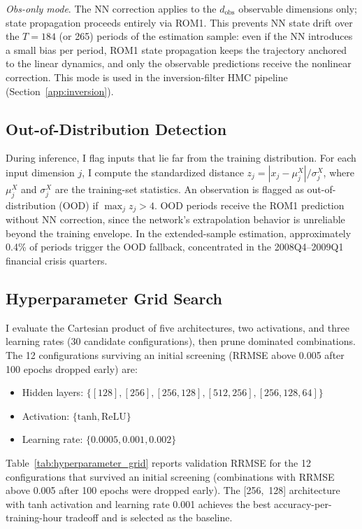 \documentclass[12pt]{article}
\theoremstyle{plain}
\theoremstyle{definition}
\theoremstyle{remark}
\begin{document}
\textit{Obs-only mode}. The NN correction applies to the $d_{\text{obs}}$ observable dimensions only; state propagation proceeds entirely via ROM1. This prevents NN state drift over the $T = 184$ (or 265) periods of the estimation sample: even if the NN introduces a small bias per period, ROM1 state propagation keeps the trajectory anchored to the linear dynamics, and only the observable predictions receive the nonlinear correction. This mode is used in the inversion-filter HMC pipeline (Section~\ref{app:inversion}).


\subsection{Out-of-Distribution Detection}
\label{app:ood}

During inference, I flag inputs that lie far from the training distribution. For each input dimension $j$, I compute the standardized distance $z_j = |x_j - \mu_j^X| / \sigma_j^X$, where $\mu_j^X$ and $\sigma_j^X$ are the training-set statistics. An observation is flagged as out-of-distribution (OOD) if $\max_j z_j > 4$. OOD periods receive the ROM1 prediction without NN correction, since the network's extrapolation behavior is unreliable beyond the training envelope. In the extended-sample estimation, approximately 0.4\% of periods trigger the OOD fallback, concentrated in the 2008Q4--2009Q1 financial crisis quarters.


\subsection{Hyperparameter Grid Search}

I evaluate the Cartesian product of five architectures, two activations, and three learning rates (30 candidate configurations), then prune dominated combinations. The 12 configurations surviving an initial screening (RRMSE above 0.005 after 100 epochs dropped early) are:
\begin{itemize}
\item Hidden layers: $\{[128], [256], [256, 128], [512, 256], [256, 128, 64]\}$
\item Activation: $\{\text{tanh}, \text{ReLU}\}$
\item Learning rate: $\{0.0005, 0.001, 0.002\}$
\end{itemize}

Table~\ref{tab:hyperparameter_grid} reports validation RRMSE for the 12 configurations that survived an initial screening (combinations with RRMSE above 0.005 after 100 epochs were dropped early). The [256,~128] architecture with tanh activation and learning rate 0.001 achieves the best accuracy-per-training-hour tradeoff and is selected as the baseline.
\end{document}
